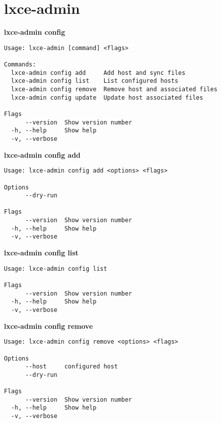 \newpage\section{lxce-admin}\label{annex:lxce-admin}

\textbf{lxce-admin config}
\begin{verbatim}
Usage: lxce-admin [command] <flags>

Commands:
  lxce-admin config add     Add host and sync files
  lxce-admin config list    List configured hosts
  lxce-admin config remove  Remove host and associated files
  lxce-admin config update  Update host associated files

Flags
      --version  Show version number                                   
  -h, --help     Show help                                             
  -v, --verbose
\end{verbatim}

\textbf{lxce-admin config add}
\begin{verbatim}
Usage: lxce-admin config add <options> <flags>

Options
      --dry-run                                                        

Flags
      --version  Show version number                                   
  -h, --help     Show help                                             
  -v, --verbose
\end{verbatim}

\textbf{lxce-admin config list}
\begin{verbatim}
Usage: lxce-admin config list

Flags
      --version  Show version number                                   
  -h, --help     Show help                                             
  -v, --verbose
\end{verbatim}

\textbf{lxce-admin config remove}
\begin{verbatim}
Usage: lxce-admin config remove <options> <flags>

Options
      --host     configured host                             
      --dry-run                                              

Flags
      --version  Show version number                                   
  -h, --help     Show help                                             
  -v, --verbose
\end{verbatim}

